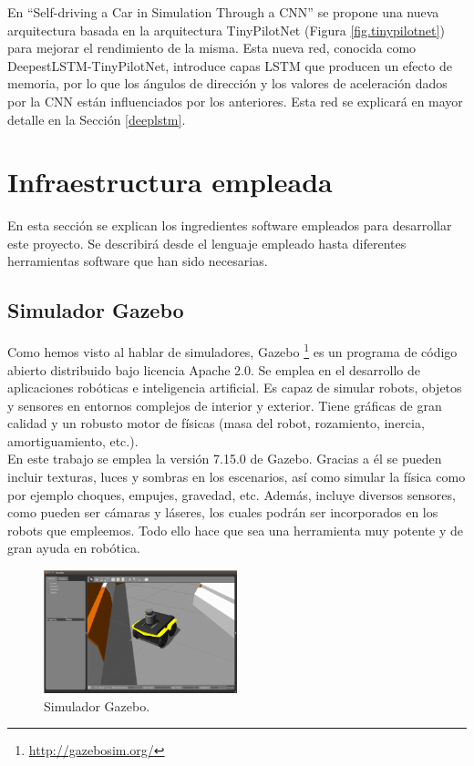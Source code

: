 En ``Self-driving  a  Car  in  Simulation  Through  a  CNN'' \cite{self-driving} se propone una nueva arquitectura basada en la arquitectura TinyPilotNet (Figura \ref{fig.tinypilotnet}) para mejorar el rendimiento de la misma. Esta nueva red, conocida como DeepestLSTM-TinyPilotNet, introduce capas LSTM que producen un efecto de memoria, por lo que los ángulos de dirección y los valores de aceleración dados por la CNN están influenciados por los anteriores. Esta red se explicará en mayor detalle en la Sección \ref{deeplstm}.\\


\section{Infraestructura empleada}

En esta sección se explican los ingredientes software empleados para desarrollar este proyecto. Se describirá desde el lenguaje empleado hasta diferentes herramientas software que han sido necesarias.

\subsection{Simulador Gazebo}

Como hemos visto al hablar de simuladores, Gazebo \footnote{\url{http://gazebosim.org/}} es un programa de código abierto distribuido bajo licencia Apache 2.0. Se emplea en el desarrollo de aplicaciones robóticas e inteligencia artificial. Es capaz de simular robots, objetos y sensores en entornos complejos de interior y exterior. Tiene gráficas de gran calidad y un robusto motor de físicas (masa del robot, rozamiento, inercia, amortiguamiento, etc.).\\

En este trabajo se emplea la versión 7.15.0 de Gazebo. Gracias a él se pueden incluir texturas, luces y sombras en los escenarios, así como simular la física como por ejemplo choques, empujes, gravedad, etc. Además, incluye diversos sensores, como pueden ser cámaras y láseres, los cuales podrán ser incorporados en los robots que empleemos. Todo ello hace que sea una herramienta muy potente y de gran ayuda en robótica.\\

\begin{figure}
\begin{center}
	\includegraphics[width=0.5\textwidth]{figures/Estado_arte/gazebo2.png}
   \caption{Simulador Gazebo.}
	\label{fig.gazebo1  }
\end{center}
\end{figure}

